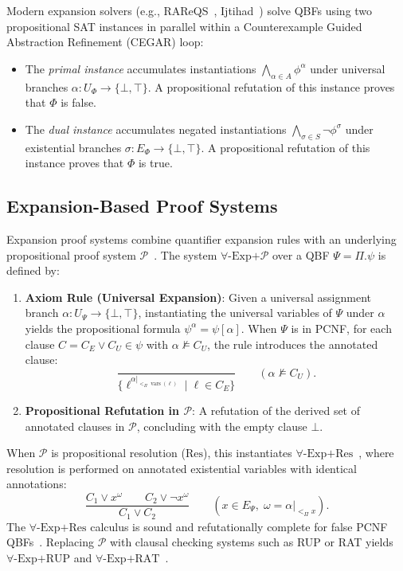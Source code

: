 \documentclass[runningheads]{llncs}
\DeclareMathOperator{\vars}{vars}
\newcommand{\Bool}{\{\bot,\top\}}
\newcommand{\ExpRes}{\forall\text{-}\mathrm{Exp}\text{+}\mathrm{Res}}
\begin{document}
Modern expansion solvers (e.g., RAReQS~\cite{rareqs}, Ijtihad~\cite{ijtihad}) solve QBFs using two propositional SAT instances in parallel within a Counterexample Guided Abstraction Refinement (CEGAR) loop:
\begin{itemize}
    \item The \emph{primal instance} accumulates instantiations $\bigwedge_{\alpha \in A} \phi^\alpha$ under universal branches $\alpha : U_\Phi \to \Bool$. A propositional refutation of this instance proves that $\Phi$ is false.
    \item The \emph{dual instance} accumulates negated instantiations $\bigwedge_{\sigma \in S} \neg\phi^\sigma$ under existential branches $\sigma : E_\Phi \to \Bool$. A propositional refutation of this instance proves that $\Phi$ is true.
\end{itemize}

\subsection{Expansion-Based Proof Systems}
\label{subsec:expres}

Expansion proof systems combine quantifier expansion rules with an underlying propositional proof system $\mathcal{P}$~\cite{janota2015, ferat}.
The system $\forall\text{-}\mathrm{Exp}\text{+}\mathcal{P}$ over a QBF $\Psi = \Pi.\psi$ is defined by:
\begin{enumerate}
    \item \textbf{Axiom Rule (Universal Expansion)}:
          Given a universal assignment branch $\alpha : U_\Psi \to \Bool$, instantiating the universal variables of $\Psi$ under $\alpha$ yields the propositional formula $\psi^\alpha = \psi[\alpha]$.
          When $\Psi$ is in PCNF, for each clause $C = C_E \lor C_U \in \psi$ with $\alpha \not\models C_U$, the rule introduces the annotated clause:
          \begin{equation}
              \frac{}{\{\ell^{\alpha|_{<_\Pi \vars(\ell)}} \mid \ell \in C_E\}} \qquad (\alpha \not\models C_U) .
          \end{equation}
    \item \textbf{Propositional Refutation in $\mathcal{P}$}:
          A refutation of the derived set of annotated clauses in $\mathcal{P}$, concluding with the empty clause $\bot$.
\end{enumerate}

When $\mathcal{P}$ is propositional resolution ($\mathrm{Res}$), this instantiates $\ExpRes$~\cite{janota2015}, where resolution is performed on annotated existential variables with identical annotations:
\begin{equation}
    \frac{C_1 \lor x^\omega \qquad C_2 \lor \neg x^\omega}{C_1 \lor C_2} \qquad (x \in E_\Psi, \; \omega = \alpha|_{<_\Pi x}) .
\end{equation}
The $\ExpRes$ calculus is sound and refutationally complete for false PCNF QBFs~\cite{janota2015}.
Replacing $\mathcal{P}$ with clausal checking systems such as RUP or RAT yields $\forall\text{-}\mathrm{Exp}\text{+RUP}$ and $\forall\text{-}\mathrm{Exp}\text{+RAT}$~\cite{ferat}.
\end{document}
